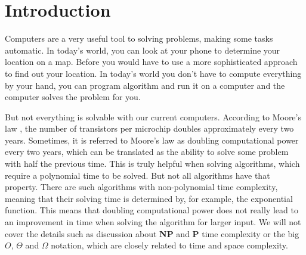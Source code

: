 \chapter{Introduction} \label{introduction}
%
%
%
%
%
%
Computers are a very useful tool to solving problems, making some tasks automatic. In today's world, you can look at your phone to determine your location on a map. Before you would have to use a more sophisticated approach to find out your location. In today's world you don't have to compute everything by your hand, you can program algorithm and run it on a computer and the computer solves the problem for you. 

But not everything is solvable with our current computers. According to Moore's law \cite{moore:1965}, the number of transistors per microchip doubles approximately every two years. Sometimes, it is referred to Moore's law as doubling computational power every two years, which can be translated as the ability to solve some problem with half the previous time. This is truly helpful when solving algorithms, which require a polynomial time to be solved. But not all algorithms have that property. There are such algorithms with non-polynomial time complexity, meaning that their solving time is determined by, for example, the exponential function. This means that doubling computational power does not really lead to an improvement in time when solving the algorithm for larger input. We will not cover the details such as discussion about \textbf{NP} and \textbf{P} time complexity or the big $O$, $\Theta$ and $\Omega$ notation, which are closely related to time and space complexity. 

